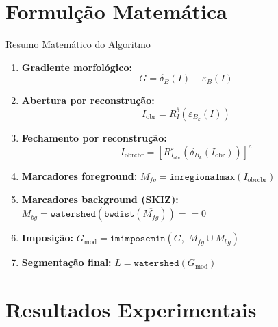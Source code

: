 \documentclass[aspectratio=169,12pt]{beamer}
\begin{document}
\section{Formul\c{c}\~ao Matem\'atica}

\begin{frame}{Resumo Matem\'atico do Algoritmo}

\begin{enumerate}
  \item \textbf{Gradiente morfol\'ogico:}
  \[
    G = \delta_B(I) - \varepsilon_B(I)
  \]

  \item \textbf{Abertura por reconstru\c{c}\~ao:}
  \[
    I_{\mathrm{obr}} = R^{\delta}_I\!\left(\varepsilon_{B_k}(I)\right)
  \]

  \item \textbf{Fechamento por reconstru\c{c}\~ao:}
  \[
    I_{\mathrm{obrcbr}} = \left[R^{\varepsilon}_{I_{\mathrm{obr}}}\!\left(\delta_{B_k}(I_{\mathrm{obr}})\right)\right]^c
  \]

  \item \textbf{Marcadores foreground:}
  $M_{fg} = \texttt{imregionalmax}(I_{\mathrm{obrcbr}})$

  \item \textbf{Marcadores background (SKIZ):}
  $M_{bg} = \texttt{watershed}\!\left(\texttt{bwdist}(\overline{M_{fg}})\right) == 0$

  \item \textbf{Imposi\c{c}\~ao:}
  $G_{\mathrm{mod}} = \texttt{imimposemin}(G,\; M_{fg} \cup M_{bg})$

  \item \textbf{Segmenta\c{c}\~ao final:}
  $L = \texttt{watershed}(G_{\mathrm{mod}})$
\end{enumerate}

\end{frame}

\section{Resultados Experimentais}
\end{document}
